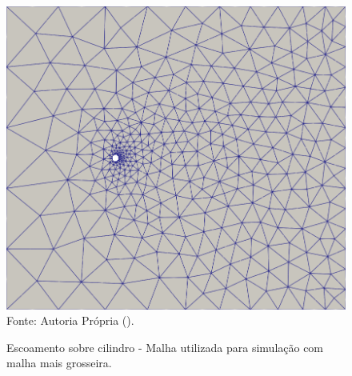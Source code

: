 \begin{figure}[h!]
    \centering
    \caption{Escoamento sobre cilindro - Malha utilizada para simulação com malha mais grosseira.}
    \includegraphics[width=.75\linewidth]{Figuras/cylinder/coarse/mesh.png}
    \\Fonte: Autoria Própria (\the\year).
    \label{fig:cyl-mesh2}
\end{figure}

